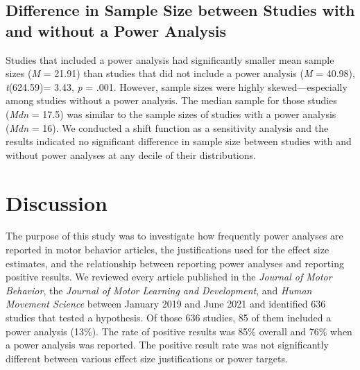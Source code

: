 \documentclass[
  man, donotrepeattitle,mask,floatsintext]{apa7}
\begin{document}
\hypertarget{difference-in-sample-size-between-studies-with-and-without-a-power-analysis}{%
\subsection{Difference in Sample Size between Studies with and without a Power Analysis}\label{difference-in-sample-size-between-studies-with-and-without-a-power-analysis}}

Studies that included a power analysis had significantly smaller mean sample sizes (\emph{M} = 21.91) than studies that did not include a power analysis (\emph{M} = 40.98), \emph{t}(624.59)= 3.43, \emph{p} = .001. However, sample sizes were highly skewed---especially among studies without a power analysis. The median sample for those studies (\emph{Mdn} = 17.5) was similar to the sample sizes of studies with a power analysis (\emph{Mdn} = 16). We conducted a shift function as a sensitivity analysis and the results indicated no significant difference in sample size between studies with and without power analyses at any decile of their distributions.

\hypertarget{discussion}{%
\section{Discussion}\label{discussion}}

The purpose of this study was to investigate how frequently power analyses are reported in motor behavior articles, the justifications used for the effect size estimates, and the relationship between reporting power analyses and reporting positive results. We reviewed every article published in the \emph{Journal of Motor Behavior}, the \emph{Journal of Motor Learning and Development}, and \emph{Human Movement Science} between January 2019 and June 2021 and identified 636 studies that tested a hypothesis. Of those 636 studies, 85 of them included a power analysis (13\%). The rate of positive results was 85\% overall and 76\% when a power analysis was reported. The positive result rate was not significantly different between various effect size justifications or power targets.
\end{document}
